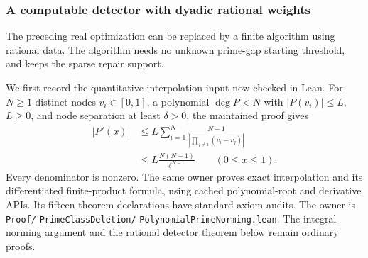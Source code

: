 \documentclass[11pt]{article}
\theoremstyle{definition}
\begin{document}
\subsubsection{A computable detector with dyadic rational weights}
\label{sec:computable-rational-prime-repairs}

The preceding real optimization can be replaced by a finite
algorithm using rational data. The algorithm needs no unknown
prime-gap starting threshold, and keeps the sparse repair support.

We first record the quantitative interpolation input now checked
in Lean. For $N\ge1$ distinct nodes $v_i\in[0,1]$, a polynomial
$\deg P<N$ with $|P(v_i)|\le L$, $L\ge0$, and node separation at least
$\delta>0$, the maintained proof gives
\begin{equation}
 \begin{aligned}
 |P'(x)|&\le L\sum_{i=1}^N
       \frac{N-1}{\left|\prod_{j\ne i}(v_i-v_j)\right|}\\
       &\le L\frac{N(N-1)}{\delta^{N-1}}
                         \qquad(0\le x\le1).
 \end{aligned}
 \label{eq:checked-node-separation-derivative}
\end{equation}
Every denominator is nonzero. The same owner proves exact
interpolation and its differentiated finite-product formula,
using cached polynomial-root and derivative APIs. Its fifteen
theorem declarations have standard-axiom audits. The owner is
\texttt{Proof/}\allowbreak
\texttt{PrimeClassDeletion/}\allowbreak
\texttt{PolynomialPrimeNorming.lean}.
The integral norming argument and the rational detector theorem
below remain ordinary proofs.
\end{document}

